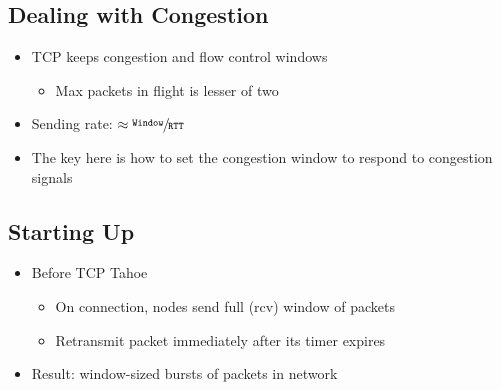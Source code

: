 \subsection{Dealing with Congestion}
\begin{itemize}
    \item TCP keeps congestion and flow control windows
          \begin{itemize}
              \item Max packets in flight is lesser of two
          \end{itemize}
    \item Sending rate: $\approx\sfrac{\texttt{Window}}{\texttt{RTT}}$
    \item The key here is how to set the congestion window to respond to congestion signals
\end{itemize}

\subsection{Starting Up}
\begin{itemize}
    \item Before TCP Tahoe
          \begin{itemize}
              \item On connection, nodes send full (rcv) window of packets
              \item Retransmit packet immediately after its timer expires
          \end{itemize}
    \item Result: window-sized bursts of packets in network
\end{itemize}

